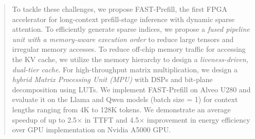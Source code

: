 \documentclass[conference]{IEEEtran}
\begin{document}
\begin{abstract}
To tackle these challenges, we propose FAST-Prefill, the first FPGA accelerator for long-context prefill-stage inference with dynamic sparse attention. To efficiently generate sparse indices, we propose a \textit{fused pipeline unit with a memory-aware execution order} to reduce large tensors and irregular memory accesses. To reduce off-chip memory traffic for accessing the KV cache, we utilize the memory hierarchy to design a \textit{liveness-driven, dual-tier cache}. For high-throughput matrix multiplication, we design a \textit{hybrid Matrix Processing Unit (MPU)} with DSPs and bit-plane decomposition using LUTs. 
We implement FAST-Prefill on Alveo U280 and evaluate it on the Llama and Qwen models (batch size = 1) for context lengths ranging from 4K to 128K tokens. We demonstrate an average speedup of up to 2.5$\times$ in TTFT and 4.5$\times$  improvement in energy efficiency over GPU implementation on Nvidia A5000 GPU. 

\end{abstract}

\end{document}
